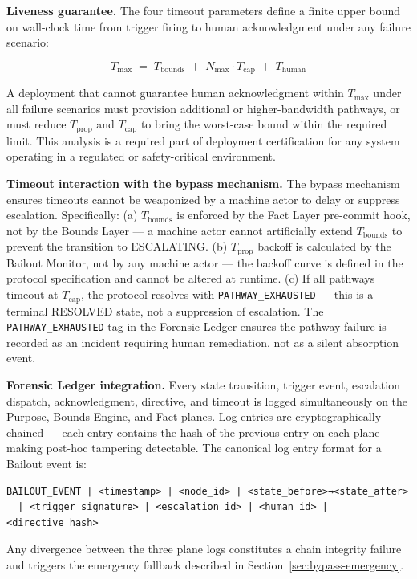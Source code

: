 \bigskip
\noindent\textbf{Liveness guarantee.} The four timeout parameters define a finite upper bound on wall-clock time from trigger firing to human acknowledgment under any failure scenario:

\[
T_{\max} \;=\; T_{\text{bounds}} \;+\; N_{\max} \cdot T_{\text{cap}} \;+\; T_{\text{human}} \tag{T-max}
\]

A deployment that cannot guarantee human acknowledgment within $T_{\max}$ under all failure scenarios must provision additional or higher-bandwidth pathways, or must reduce $T_{\text{prop}}$ and $T_{\text{cap}}$ to bring the worst-case bound within the required limit. This analysis is a required part of deployment certification for any \bxthree{} system operating in a regulated or safety-critical environment.

\bigskip
\noindent\textbf{Timeout interaction with the bypass mechanism.} The bypass mechanism ensures timeouts cannot be weaponized by a machine actor to delay or suppress escalation. Specifically: (a) $T_{\text{bounds}}$ is enforced by the Fact Layer pre-commit hook, not by the Bounds Layer — a machine actor cannot artificially extend $T_{\text{bounds}}$ to prevent the transition to ESCALATING. (b) $T_{\text{prop}}$ backoff is calculated by the Bailout Monitor, not by any machine actor — the backoff curve is defined in the protocol specification and cannot be altered at runtime. (c) If all pathways timeout at $T_{\text{cap}}$, the protocol resolves with \texttt{PATHWAY\_EXHAUSTED} — this is a terminal RESOLVED state, not a suppression of escalation. The \texttt{PATHWAY\_EXHAUSTED} tag in the Forensic Ledger ensures the pathway failure is recorded as an incident requiring human remediation, not as a silent absorption event.

\bigskip
\noindent\textbf{Forensic Ledger integration.} Every state transition, trigger event, escalation dispatch, acknowledgment, directive, and timeout is logged simultaneously on the Purpose, Bounds Engine, and Fact planes. Log entries are cryptographically chained — each entry contains the hash of the previous entry on each plane — making post-hoc tampering detectable. The canonical log entry format for a Bailout event is:

\begin{verbatim}
BAILOUT_EVENT | <timestamp> | <node_id> | <state_before>→<state_after>
  | <trigger_signature> | <escalation_id> | <human_id> | <directive_hash>
\end{verbatim}

Any divergence between the three plane logs constitutes a chain integrity failure and triggers the emergency fallback described in Section~\ref{sec:bypass-emergency}.